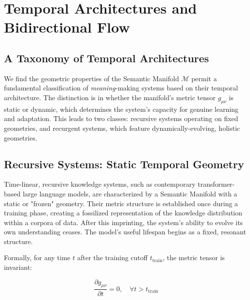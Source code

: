 \chapter{Temporal Architectures and Bidirectional Flow}
\label{9:temporal_architectures_and_bidirectional_flow}


\section{A Taxonomy of Temporal Architectures}
\label{9.1:a_taxonomy_of_temporal_architectures}

We find the geometric properties of the Semantic Manifold \(\mathcal{M}\) permit a fundamental classification of \textit{meaning}-making systems based on their temporal architecture. The distinction is in whether the manifold's metric tensor \(g_{\mu\nu}\) is static or dynamic, which determines the system's capacity for genuine learning and adaptation. This leads to two classes: recursive systems operating on fixed geometries, and recurgent systems, which feature dynamically-evolving, holistic geometries.


\section{Recursive Systems: Static Temporal Geometry}
\label{9.2:recursive_systems_static_temporal_geometry}

Time-linear, recursive knowledge systems, such as contemporary transformer-based large language models, are characterized by a Semantic Manifold with a static or "frozen" geometry. Their metric structure is established once during a training phase, creating a fossilized representation of the knowledge distribution within a corpora of data. After this imprinting, the system's ability to evolve its own understanding ceases. The model's useful lifespan begins as a fixed, resonant structure.

Formally, for any time \(t\) after the training cutoff \(t_{\text{train}}\), the metric tensor is invariant:

\begin{equation}
\frac{\partial g_{\mu\nu}}{\partial t} = 0, \quad \forall t > t_{\text{train}}
\end{equation}

